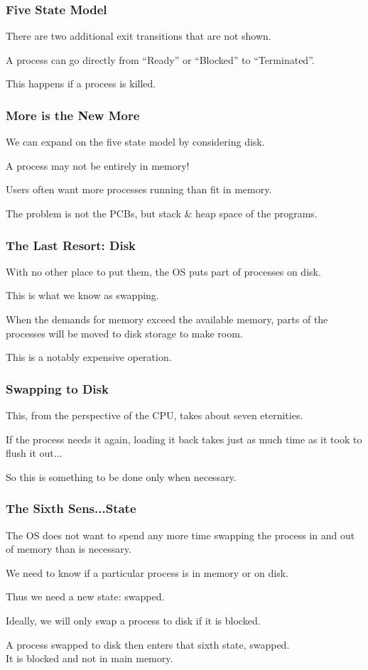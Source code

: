 \begin{frame}
	\frametitle{Five State Model}

	There are two additional exit transitions that are not shown.

	A process can go directly from ``Ready'' or ``Blocked'' to ``Terminated''.

	This happens if a process is killed.

\end{frame}

\begin{frame}
	\frametitle{More is the New More}

	We can expand on the five state model by considering disk.

	A process may not be entirely in memory!

	Users often want more processes running than fit in memory.

	The problem is not the PCBs, but stack \& heap space of the programs.

\end{frame}

\begin{frame}
	\frametitle{The Last Resort: Disk}

	With no other place to put them, the OS puts part of processes on disk.

	This is what we know as \alert{swapping}.

	When the demands for memory exceed the available memory, parts of the processes will be moved to disk storage to make room.

	This is a notably expensive operation.
\end{frame}

\begin{frame}
	\frametitle{Swapping to Disk}

	This, from the perspective of the CPU, takes about seven eternities.

	If the process needs it again, loading it back takes just as much time as it took to flush it out...

	So this is something to be done only when necessary.

\end{frame}

\begin{frame}
	\frametitle{The Sixth Sens...State}

	The OS does not want to spend any more time swapping the process in and out of memory than is necessary.

	We need to know if a particular process is in memory or on disk.

	Thus we need a new state: swapped.

	Ideally, we will only swap a process to disk if it is blocked.

	A process swapped to disk then enters that sixth state, swapped.\\
	\quad It is blocked and not in main memory.

\end{frame}

